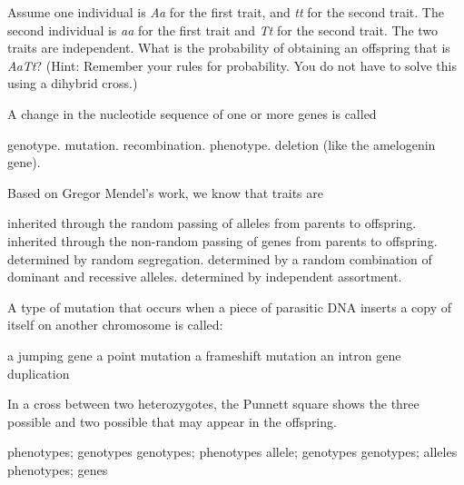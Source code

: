 
\question
Assume one individual is \textit{Aa} for the first trait, and \textit{tt} for the second trait. The second individual is \textit{aa} for the first trait and \textit{Tt} for the second trait. The two traits are independent.  What is the probability of obtaining an offspring that is \textit{AaTt}? (Hint: Remember your rules for probability. You do not have to solve this using a dihybrid cross.)

\begin{choices}
\end{choices}

\question
A change in the nucleotide sequence of one or more genes is called

\begin{choices}
\choice genotype.
\correctchoice mutation.
\choice recombination.
\choice phenotype.
\choice deletion (like the amelogenin gene).
\end{choices}

\question
Based on Gregor Mendel's work, we know that traits are

\begin{choices}
\correctchoice inherited through the random passing of alleles from parents to offspring.
\choice inherited through the non-random passing of genes from parents to offspring.
\choice determined by random segregation.
\choice determined by a random combination of dominant and recessive alleles.
\choice determined by independent assortment.
\end{choices}

\question
A type of mutation that occurs when a piece of parasitic DNA inserts a copy of itself on another chromosome is called:

\begin{choices}
\correctchoice a jumping gene
\choice a point mutation
\choice a frameshift mutation
\choice an intron
\choice gene duplication
\end{choices}

\question
In a cross between two heterozygotes, the Punnett square shows the three possible \underline{\hspace{2cm}} and two possible \underline{\hspace{2cm}} that may appear in the offspring.

\begin{choices}
\choice phenotypes; genotypes
\choice genotypes; phenotypes
\choice allele; genotypes
\correctchoice genotypes; alleles
\choice phenotypes; genes
\end{choices}

